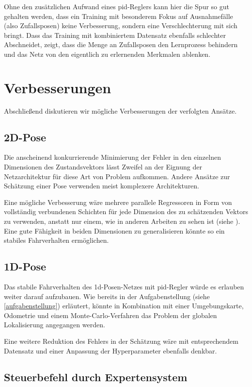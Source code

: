 Ohne den zusätzlichen Aufwand eines \acs{pid}-Reglers kann hier die Spur so gut gehalten werden, dass ein Training mit besonderem Fokus auf Ausnahmefälle (also Zufallsposen) keine Verbesserung, sondern eine Verschlechterung mit sich bringt. Dass das Training mit kombiniertem Datensatz ebenfalls schlechter Abschneidet, zeigt, dass die Menge an Zufallsposen den Lernprozess behindern und das Netz von den eigentlich zu erlernenden Merkmalen ablenken.

\section{Verbesserungen}

Abschließend diskutieren wir mögliche Verbesserungen der verfolgten Ansätze.

\subsection{2D-Pose}

Die anscheinend konkurrierende Minimierung der Fehler in den einzelnen Dimensionen des Zustandsvektors lässt Zweifel an der Eignung der Netzarchitektur für diese Art von Problem aufkommen. Andere Ansätze zur Schätzung einer Pose verwenden meist komplexere Architekturen.

Eine mögliche Verbesserung wäre mehrere parallele Regressoren in Form von vollständig verbundenen Schichten für jede Dimension des zu schätzenden Vektors zu verwenden, anstatt nur einem, wie in anderen Arbeiten zu sehen ist (siehe \cite{camposeestimation}). Eine gute Fähigkeit in beiden Dimensionen zu generalisieren könnte so ein stabiles Fahrverhalten ermöglichen.

\subsection{1D-Pose}

Das stabile Fahrverhalten des \acs{1d}-Posen-Netzes mit \acs{pid}-Regler würde es erlauben weiter darauf aufzubauen. Wie bereits in der Aufgabenstellung (siehe \ref{aufgabenstellung}) erläutert, könnte in Kombination mit einer Umgebungskarte, Odometrie und einem Monte-Carlo-Verfahren das Problem der globalen Lokalisierung angegangen werden.

Eine weitere Reduktion des Fehlers in der Schätzung wäre mit entsprechendem Datensatz und einer Anpassung der Hyperparameter ebenfalls denkbar.

\subsection{Steuerbefehl durch Expertensystem}

